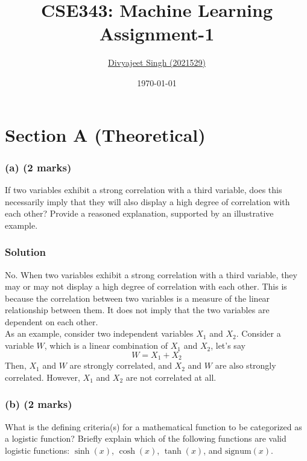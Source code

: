 \documentclass[12pt]{article}
\title{
    \textbf{CSE343: Machine Learning} \\ \vspace*{-5pt}
    \textbf{\large{Assignment-1}}
}
\author{\href{mailto:divyajeet21529@iiitd.ac.in}{Divyajeet Singh (2021529)}}
\date{\today}
\begin{document}
    \maketitle

    \section{Section A (Theoretical)}

    \subsubsection*{(a) (2 marks)}
    If two variables exhibit a strong correlation with a third variable, does this necessarily imply that they will also display
    a high degree of correlation with each other? Provide a reasoned explanation, supported by an illustrative example.

    \subsubsection*{Solution}
    No. When two variables exhibit a strong correlation with a third variable, they may or may not display a high degree of
    correlation with each other. This is because the correlation between two variables is a measure of the linear relationship
    between them. It does not imply that the two variables are dependent on each other.
    \vspace*{5pt} \\
    As an example, consider two independent variables $X_{1}$ and $X_{2}$. Consider a variable $W$, which is a linear combination
    of $X_{1}$ and $X_{2}$, let's say
    \begin{equation}
        W = X_{1} + X_{2}
    \end{equation}
    Then, $X_{1}$ and $W$ are
    strongly correlated, and $X_{2}$ and $W$ are also strongly correlated. However, $X_{1}$ and $X_{2}$ are not correlated at all.

    \subsubsection*{(b) (2 marks)}
    What is the defining criteria(s) for a mathematical function to be categorized as a logistic function? Briefly explain which
    of the following functions are valid logistic functions: $\sinh{(x)}$, $\cosh{(x)}$, $\tanh{(x)}$, and $\text{signum}{(x)}$.
\end{document}
